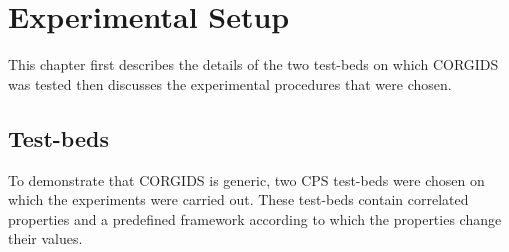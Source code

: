 
\chapter{\textbf{Experimental Setup}}
\label{sec4:ExperimentalDetail}

This chapter first describes the details of the two test-beds on which \ac{CORGIDS} was tested then discusses the experimental procedures that were chosen. 

\section{Test-beds}
To demonstrate that \ac{CORGIDS} is generic, two \ac{CPS} test-beds were chosen on which the experiments were carried out. These test-beds contain correlated properties and a predefined framework according to which the properties change their values. 

